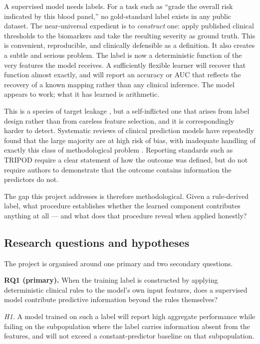 \documentclass[11pt,a4paper]{article}
\begin{document}
A supervised model needs labels. For a task such as ``grade the overall risk
indicated by this blood panel,'' no gold-standard label exists in any public
dataset. The near-universal expedient is to \emph{construct} one: apply published
clinical thresholds to the biomarkers and take the resulting severity as ground
truth. This is convenient, reproducible, and clinically defensible as a definition.
It also creates a subtle and serious problem. The label is now a deterministic
function of the very features the model receives. A sufficiently flexible learner
will recover that function almost exactly, and will report an accuracy or AUC that
reflects the recovery of a known mapping rather than any clinical inference. The
model appears to work; what it has learned is arithmetic.

This is a species of target leakage \cite{kaufman2012leakage}, but a
self-inflicted one that arises from label design rather than from careless feature
selection, and it is correspondingly harder to detect. Systematic reviews of
clinical prediction models have repeatedly found that the large majority are at
high risk of bias, with inadequate handling of exactly this class of methodological
problem \cite{wynants2020prediction, roberts2021common}. Reporting standards such
as TRIPOD \cite{collins2015tripod} require a clear statement of how the outcome was
defined, but do not require authors to demonstrate that the outcome contains
information the predictors do not.

The gap this project addresses is therefore methodological. Given a rule-derived
label, what procedure establishes whether the learned component contributes
anything at all --- and what does that procedure reveal when applied honestly?

\subsection{Research questions and hypotheses}

The project is organised around one primary and two secondary questions.

\medskip
\noindent\textbf{RQ1 (primary).} When the training label is constructed by applying
deterministic clinical rules to the model's own input features, does a supervised
model contribute predictive information beyond the rules themselves?

\noindent\emph{H1.} A model trained on such a label will report high aggregate
performance while failing on the subpopulation where the label carries information
absent from the features, and will not exceed a constant-predictor baseline on
that subpopulation.
\end{document}
